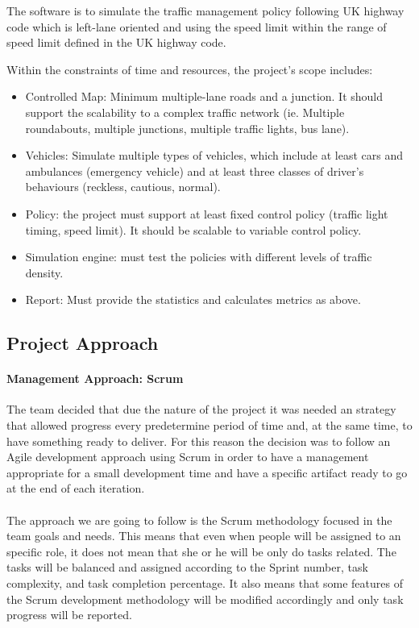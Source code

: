 \documentclass[11pt]{article}
\begin{document}
The software is to simulate the traffic management policy following UK highway code which is left-lane oriented and using the speed limit within the range of speed limit defined in the UK highway code.


Within the constraints of time and resources, the project’s scope includes:
\begin{itemize}
\item Controlled Map: Minimum multiple-lane roads and a junction. It should support the scalability to a complex traffic network (ie. Multiple roundabouts, multiple junctions, multiple traffic lights, bus lane).
\item Vehicles: Simulate multiple types of vehicles, which include at least cars and ambulances (emergency vehicle) and at least three classes of driver’s behaviours (reckless, cautious, normal).
\item Policy: the project must support at least fixed control policy (traffic light timing, speed limit). It should be scalable to variable control policy.
\item Simulation engine: must test the policies with different levels of traffic density.
\item Report: Must provide the statistics and calculates metrics as above.
\end{itemize}


\subsection{Project Approach}
	\paragraph{Management Approach: Scrum} The team decided that due the nature of the project it was needed an strategy that allowed progress every predetermine period of time and, at the same time, to have something ready to deliver. For this reason the decision was to follow an Agile development approach using Scrum in order to have a management appropriate for a small development time and  have a specific artifact ready to go at the end of each iteration.
	\paragraph{}The approach we are going to follow is the Scrum methodology focused in the team goals and needs. This means that even when people will be assigned to an specific role, it does not mean that she or he will be only do tasks related. The tasks will be balanced and assigned according to the Sprint number, task complexity, and task completion percentage. It also means that some features of the Scrum development methodology will be modified accordingly and only task progress will be reported.
\end{document}
